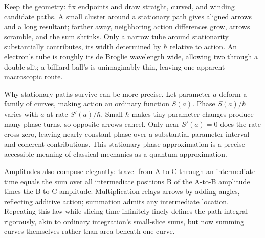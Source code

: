 Keep the geometry: fix endpoints and draw straight, curved, and winding candidate paths. A small cluster around a stationary path gives aligned arrows and a long resultant; farther away, neighboring action differences grow, arrows scramble, and the sum shrinks. Only a narrow tube around stationarity substantially contributes, its width determined by \(\hbar\) relative to action. An electron's tube is roughly its de Broglie wavelength wide, allowing two through a double slit; a billiard ball's is unimaginably thin, leaving one apparent macroscopic route.

\begin{center}
\end{center}

\begin{mathbridge}
Why stationary paths survive can be more precise. Let parameter \(a\) deform a family of curves, making action an ordinary function \(S(a)\). Phase \(S(a)/\hbar\) varies with \(a\) at rate \(S'(a)/\hbar\). Small \(\hbar\) makes tiny parameter changes produce many phase turns, so opposite arrows cancel. Only near \(S'(a)=0\) does the rate cross zero, leaving nearly constant phase over a substantial parameter interval and coherent contributions. This stationary-phase approximation is a precise accessible meaning of classical mechanics as a quantum approximation.

Amplitudes also compose elegantly: travel from A to C through an intermediate time equals the sum over all intermediate positions B of the A-to-B amplitude times the B-to-C amplitude. Multiplication relays arrows by adding angles, reflecting additive action; summation admits any intermediate location. Repeating this law while slicing time infinitely finely defines the path integral rigorously, akin to ordinary integration's small-slice sums, but now summing curves themselves rather than area beneath one curve.
\end{mathbridge}

